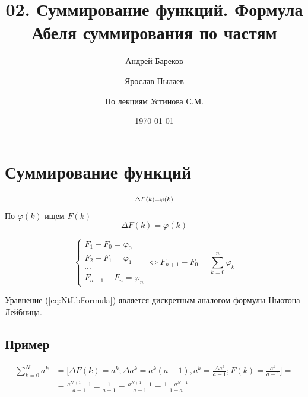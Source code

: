 \documentclass[a4paper,11pt]{article}
\title{02. Суммирование функций. Формула Абеля суммирования по частям}
\author{Андрей Бареков \and Ярослав Пылаев \and По лекциям Устинова С.М.}
\date{\today}
\begin{document}
\maketitle
\newpage

\section{Суммирование функций}
\marginpar
{
  \begin{gather*}
    \begin{subarray}{1}
      \Delta F(k)= \varphi (k) \\
    \end{subarray}
  \end{gather*}
  \footnotesize По $\varphi (k)$ ищем $F(k)$
}
\begin{equation}
  \Delta F(k) = \varphi(k)
\end{equation}

\begin{equation}
  \begin{cases}
    F_1 - F_0 = \varphi_0 \\
    F_2 - F_1 = \varphi_1 \\
    \cdots \\
    F_{n+1} - F_n = \varphi_n
  \end{cases} \Leftrightarrow F_{n+1} - F_0 = \sum_{k=0}^{n} \varphi_k
  \label{eq:NtLbFormula}
\end{equation}

Уравнение (\ref{eq:NtLbFormula}) является дискретным аналогом формулы Ньютона-Лейбница.
\subsection{Пример}
\begin{equation*}
  \begin{split}
    \sum_{k=0}^{N} a^k & = \bigg[ \Delta F(k) = a^k; \Delta a^k = a^k(a-1), a^k = \frac{\Delta a^k}{a-1}; F(k) = \frac{a^k}{a-1} \bigg] = \\
    & = \frac{a^{N+1}-1}{a-1} - \frac{1}{a-1} = \frac{a^{N+1}-1}{a-1} = \frac{1-a^{N+1}}{1-a}
  \end{split}
\end{equation*}
\end{document}
